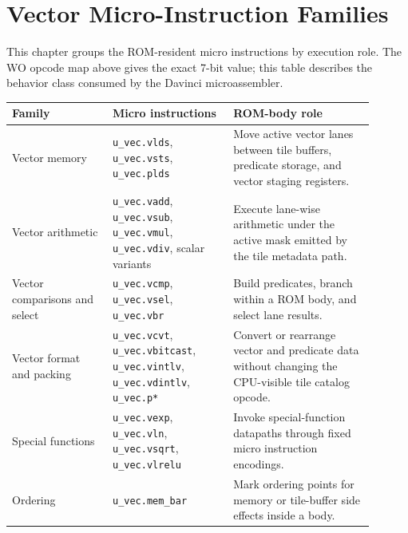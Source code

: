 \section{Vector Micro-Instruction Families}
This chapter groups the ROM-resident micro instructions by execution role. The WO opcode map above gives the exact 7-bit value; this table describes the behavior class consumed by the Davinci microassembler.
\begin{longtable}{@{}L{0.25\linewidth}L{0.30\linewidth}L{0.35\linewidth}@{}}
\toprule
Family & Micro instructions & ROM-body role \\
\midrule
Vector memory & \texttt{u\_vec.vlds}, \texttt{u\_vec.vsts}, \texttt{u\_vec.plds} & Move active vector lanes between tile buffers, predicate storage, and vector staging registers. \\
Vector arithmetic & \texttt{u\_vec.vadd}, \texttt{u\_vec.vsub}, \texttt{u\_vec.vmul}, \texttt{u\_vec.vdiv}, scalar variants & Execute lane-wise arithmetic under the active mask emitted by the tile metadata path. \\
Vector comparisons and select & \texttt{u\_vec.vcmp}, \texttt{u\_vec.vsel}, \texttt{u\_vec.vbr} & Build predicates, branch within a ROM body, and select lane results. \\
Vector format and packing & \texttt{u\_vec.vcvt}, \texttt{u\_vec.vbitcast}, \texttt{u\_vec.vintlv}, \texttt{u\_vec.vdintlv}, \texttt{u\_vec.p*} & Convert or rearrange vector and predicate data without changing the CPU-visible tile catalog opcode. \\
Special functions & \texttt{u\_vec.vexp}, \texttt{u\_vec.vln}, \texttt{u\_vec.vsqrt}, \texttt{u\_vec.vlrelu} & Invoke special-function datapaths through fixed micro instruction encodings. \\
Ordering & \texttt{u\_vec.mem\_bar} & Mark ordering points for memory or tile-buffer side effects inside a body. \\
\bottomrule
\end{longtable}
